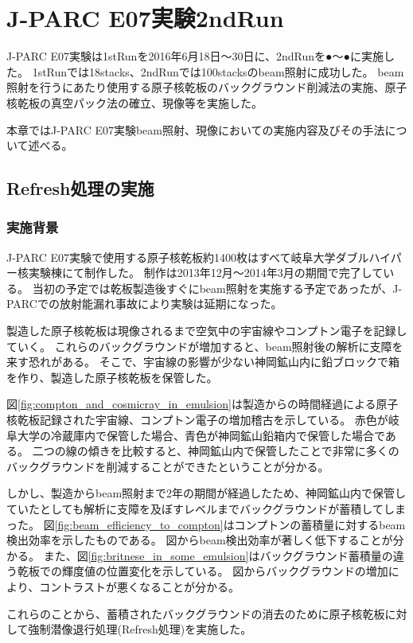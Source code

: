 \documentclass[12pt,a4paper]{jarticle}
\begin{document}
\newpage
\section{J-PARC E07実験2ndRun}
J-PARC E07実験は1stRunを2016年6月18日〜30日に、2ndRunを●～●に実施した。
1stRunでは18stacks、2ndRunでは100stacksのbeam照射に成功した。
beam照射を行うにあたり使用する原子核乾板のバックグラウンド削減法の実施、原子核乾板の真空パック法の確立、現像等を実施した。
\par
本章ではJ-PARC E07実験beam照射、現像においての実施内容及びその手法について述べる。
\subsection{Refresh処理の実施}
\subsubsection{実施背景}
J-PARC E07実験で使用する原子核乾板約1400枚はすべて岐阜大学ダブルハイパー核実験棟にて制作した。
制作は2013年12月～2014年3月の期間で完了している。
当初の予定では乾板製造後すぐにbeam照射を実施する予定であったが、J-PARCでの放射能漏れ事故により実験は延期になった。
\par
製造した原子核乾板は現像されるまで空気中の宇宙線やコンプトン電子を記録していく。
これらのバックグラウンドが増加すると、beam照射後の解析に支障を来す恐れがある。
そこで、宇宙線の影響が少ない神岡鉱山内に鉛ブロックで箱を作り、製造した原子核乾板を保管した。
\par
図\ref{fig:compton_and_cosmicray_in_emulsion}は製造からの時間経過による原子核乾板記録された宇宙線、コンプトン電子の増加稽古を示している。
赤色が岐阜大学の冷蔵庫内で保管した場合、青色が神岡鉱山鉛箱内で保管した場合である。
二つの線の傾きを比較すると、神岡鉱山内で保管したことで非常に多くのバックグラウンドを削減することができたということが分かる。
\par
しかし、製造からbeam照射まで2年の期間が経過したため、神岡鉱山内で保管していたとしても解析に支障を及ぼすレベルまでバックグラウンドが蓄積してしまった。
図\ref{fig:beam_efficiency_to_compton}はコンプトンの蓄積量に対するbeam検出効率を示したものである。
図からbeam検出効率が著しく低下することが分かる。
また、図\ref{fig:britnese_in_some_emulsion}はバックグラウンド蓄積量の違う乾板での輝度値の位置変化を示している。
図からバックグラウンドの増加により、コントラストが悪くなることが分かる。
\par
これらのことから、蓄積されたバックグラウンドの消去のために原子核乾板に対して強制潜像退行処理(Refresh処理)を実施した。
\end{document}
